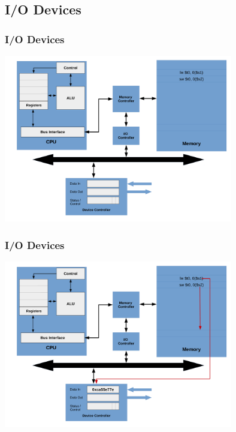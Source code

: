 \documentclass{beamer}
\begin{document}
\subsection{I/O Devices}

\begin{frame}%
\frametitle{I/O Devices}

\vspace*{-0.2cm}
\begin{center}
  \hspace*{-1cm}\includegraphics[width=10cm]{io_device1.pdf}
\end{center}

\end{frame}

\begin{frame}%
\frametitle{I/O Devices}

\vspace*{-0.2cm}
\begin{center}
\hspace*{-1cm}\includegraphics[width=10cm]{io_device2.pdf}
\end{center}

\end{frame}
\end{document}
